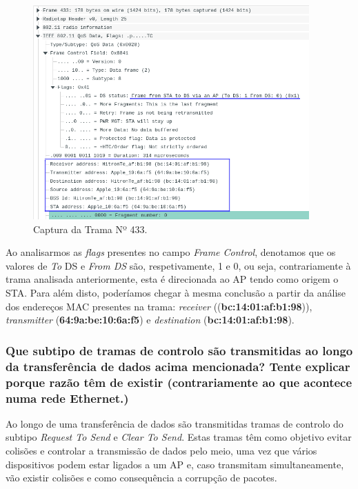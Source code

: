    \begin{figure}[H]
    \centering
    \includegraphics[width=300pt]{Prints/Questao7/questao7-433.png}
    \caption{Captura da Trama Nº 433.} \label{questao7-1-trama433}
    \end{figure}

    \par Ao analisarmos as \textit{flags} presentes no campo \textit{Frame Control}, denotamos que os valores de \textit{To} DS e \textit{From DS} são, respetivamente, 1 e 0, ou seja, contrariamente à trama analisada anteriormente, esta é direcionada ao AP tendo como origem o STA. Para além disto, poderíamos chegar à mesma conclusão a partir da análise dos endereços MAC presentes na trama: \textit{receiver} ((\textbf{bc:14:01:af:b1:98})), \textit{transmitter} (\textbf{64:9a:be:10:6a:f5}) e \textit{destination} (\textbf{bc:14:01:af:b1:98}).







\subsubsection{Que subtipo de tramas de controlo são transmitidas ao longo da transferência de dados acima mencionada? Tente explicar porque razão têm de existir (contrariamente ao que acontece numa rede Ethernet.)}

    \par Ao longo de uma transferência de dados são transmitidas tramas de controlo do subtipo \textit{Request To Send} e \textit{Clear To Send}. Estas tramas têm como objetivo evitar colisões e controlar a transmissão de dados pelo meio, uma vez que vários dispositivos podem estar ligados a um AP e, caso transmitam simultaneamente, vão existir colisões e como consequência a corrupção de pacotes.
    
